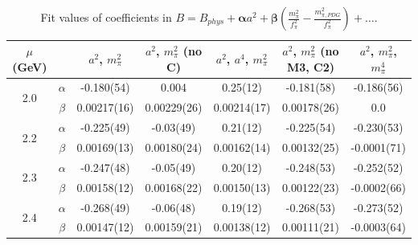 \documentclass[12pt]{extarticle}
\begin{document}
\begin{table}[h!]
\begin{center}
\begin{tabular}{|c c|c|c|c|c|c|}
\hline
$\mu$ (GeV) &  & $a^2$, $m_\pi^2$& $a^2$, $m_\pi^2$ (no C)& $a^2$, $a^4$, $m_\pi^2$& $a^2$, $m_\pi^2$ (no M3, C2)& $a^2$, $m_\pi^2$, $m_\pi^4$\\
\hline
\multirow{2}{0.5in}{2.0} & $\alpha$ & -0.180(54)& 0.004& 0.25(12)& -0.181(58)& -0.186(56)\\
 & $\beta$ & 0.00217(16)& 0.00229(26)& 0.00214(17)& 0.00178(26)& 0.0\\
\hline
\multirow{2}{0.5in}{2.2} & $\alpha$ & -0.225(49)& -0.03(49)& 0.21(12)& -0.225(54)& -0.230(53)\\
 & $\beta$ & 0.00169(13)& 0.00180(24)& 0.00162(14)& 0.00132(25)& -0.0001(71)\\
\hline
\multirow{2}{0.5in}{2.3} & $\alpha$ & -0.247(48)& -0.05(49)& 0.20(12)& -0.248(53)& -0.252(52)\\
 & $\beta$ & 0.00158(12)& 0.00168(22)& 0.00150(13)& 0.00122(23)& -0.0002(66)\\
\hline
\multirow{2}{0.5in}{2.4} & $\alpha$ & -0.268(49)& -0.06(48)& 0.19(12)& -0.268(53)& -0.273(52)\\
 & $\beta$ & 0.00147(12)& 0.00159(21)& 0.00138(12)& 0.00111(21)& -0.0003(64)\\
\hline
\end{tabular}
\caption{Fit values of coefficients in $B = B_{phys} + \mathbf{\alpha} a^2 + \mathbf{\beta}\left(\frac{m_\pi^2}{f_\pi^2}-\frac{m_{\pi,PDG}^2}{f_\pi^2}\right) + \ldots$.}
\end{center}
\end{table}




















\clearpage
\end{document}
